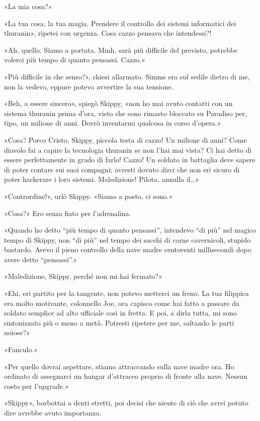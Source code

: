 «La mia cosa?»

«La tua cosa, la tua magia. Prendere il controllo dei sistemi
informatici dei thuranin», ripetei con urgenza. Cosa cazzo pensava che
intendessi?!

«Ah, quello. Siamo a portata. Mmh, sarà più difficile del previsto,
potrebbe volerci più tempo di quanto pensassi. Cazzo.»

«Più difficile in che senso?», chiesi allarmato. Simms era sul sedile
dietro di me, non la vedevo, eppure potevo avvertire la sua tensione.

«Beh, a essere sincero», spiegò Skippy, «non ho mai avuto contatti con
un sistema thuranin prima d'ora, visto che sono rimasto bloccato su
Paradiso per, tipo, un milione di anni. Dovrò inventarmi qualcosa in
corso d'opera.»

«Cosa? Porco Cristo, Skippy, piccola testa di cazzo! Un milione di anni?
Come diavolo fai a capire la tecnologia thuranin se non l'hai mai vista?
Ci hai detto di essere perfettamente in grado di farlo! Cazzo! Un
soldato in battaglia deve sapere di poter contare sui suoi compagni;
avresti dovuto dirci che non eri sicuro di poter hackerare i loro
sistemi. Maledizione! Pilota, annulla il\ldots»

«Contrordine!», urlò Skippy. «Siamo a posto, ci sono.»

«Cosa?» Ero senza fiato per l'adrenalina.

«Quando ho detto ``più tempo di quanto pensassi'', intendevo ``di più''
nel magico tempo di Skippy, non ``di più'' nel tempo dei sacchi di carne
cavernicoli, stupido bastardo. Avevo il pieno controllo della nave madre
centoventi millisecondi dopo avere detto ``pensassi''.»

«Maledizione, Skippy, perché non mi hai fermato?»

«Ehi, eri partito per la tangente, non potevo metterci un freno. La tua
filippica era molto motivante, colonnello Joe, ora capisco come hai
fatto a passare da soldato semplice ad alto ufficiale così in fretta. E
poi, a dirla tutta, mi sono sintonizzato più o meno a metà. Potresti
ripetere per me, saltando le parti noiose?»

«Fanculo.»

«Per quello dovrai aspettare, stiamo attraccando sulla nave madre ora.
Ho ordinato di assegnarci un hangar d'attracco proprio di fronte alla
nave. Nessun costo per l'upgrade.»

«Skippy», borbottai a denti stretti, poi decisi che niente di ciò che
avrei potuto dire avrebbe avuto importanza.

